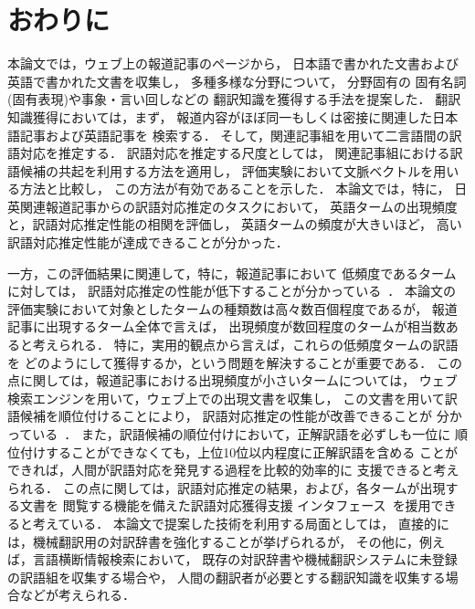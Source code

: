 \section{おわりに}

本論文では，ウェブ上の報道記事のページから，
日本語で書かれた文書および英語で書かれた文書を収集し，
多種多様な分野について，
分野固有の
固有名詞(固有表現)や事象・言い回しなどの
翻訳知識を獲得する手法を提案した．
翻訳知識獲得においては，まず，
報道内容がほぼ同一もしくは密接に関連した日本語記事および英語記事を
検索する．
そして，関連記事組を用いて二言語間の訳語対応を推定する．
訳語対応を推定する尺度としては，
関連記事組における訳語候補の共起を利用する方法を適用し，
評価実験において文脈ベクトルを用いる方法と比較し，
この方法が有効であることを示した．
本論文では，特に，
日英関連報道記事からの訳語対応推定のタスクにおいて，
英語タームの出現頻度と，訳語対応推定性能の相関を評価し，
英語タームの頻度が大きいほど，
高い訳語対応推定性能が達成できることが分かった．

一方，この評価結果に関連して，特に，報道記事において
低頻度であるタームに対しては，
訳語対応推定の性能が低下することが分かっている~\cite{Hino04bj}．
本論文の評価実験において対象としたタームの種類数は高々数百個程度であるが，
報道記事に出現するターム全体で言えば，
出現頻度が数回程度のタームが相当数あると考えられる．
特に，実用的観点から言えば，これらの低頻度タームの訳語を
どのようにして獲得するか，という問題を解決することが重要である．
この点に関しては，報道記事における出現頻度が小さいタームについては，
ウェブ検索エンジンを用いて，ウェブ上での出現文書を収集し，
この文書を用いて訳語候補を順位付けることにより，
訳語対応推定の性能が改善できることが
分かっている~\cite{Utsuro04d,Kida04bj}．
また，訳語候補の順位付けにおいて，正解訳語を必ずしも一位に
順位付けすることができなくても，上位10位以内程度に正解訳語を含める
ことができれば，人間が訳語対応を発見する過程を比較的効率的に
支援できると考えられる．
この点に関しては，訳語対応推定の結果，および，各タームが出現する文書を
閲覧する機能を備えた訳語対応獲得支援
インタフェース~\cite{Utsuro02gs,Hino03aj}を援用できると考えている．
本論文で提案した技術を利用する局面としては，
直接的には，機械翻訳用の対訳辞書を強化することが挙げられるが，
その他に，例えば，言語横断情報検索において，
既存の対訳辞書や機械翻訳システムに未登録の訳語組を収集する場合や，
人間の翻訳者が必要とする翻訳知識を収集する場合などが考えられる．










